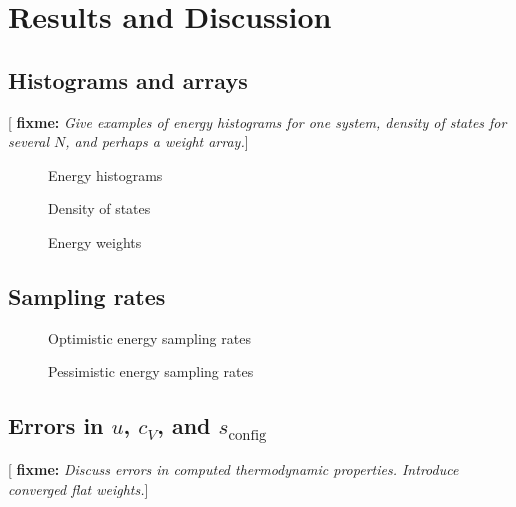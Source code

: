 \documentclass[11pt]{article}
\renewcommand{\t}{\text} %
\newcommand{\red}[1]{{\bf \color{red} #1}}
\newcommand{\fixme}[1]{[\red{fixme:} \emph{#1}]}
\begin{document}
\section{Results and Discussion}
\label{sec:results}

\subsection{Histograms and arrays}
\label{sec:histograms}

\fixme{Give examples of energy histograms for one system, density of
  states for several $N$, and perhaps a weight array.}

\begin{figure}[H]
  \centering
  \caption[Energy histograms]{Energy histograms}
  \label{fig:histograms}
\end{figure}

\begin{figure}[H]
  \centering
  \caption[Density of states]{Density of states}
  \label{fig:density_of_states}
\end{figure}

\begin{figure}[H]
  \centering
  \caption[Energy weights]{Energy weights}
  \label{fig:weights}
\end{figure}

\subsection{Sampling rates}
\label{sec:sampling_rates}

\begin{figure}[H]
  \centering
  \caption[Optimistic energy sampling rates]{Optimistic energy
    sampling rates}
  \label{fig:opt_sample_rate}
\end{figure}

\begin{figure}[H]
  \centering
  \caption[Pessimistic energy sampling rates]{Pessimistic energy
    sampling rates}
  \label{fig:pes_sample_rate}
\end{figure}

\subsection{Errors in $u$, $c_V$, and $s_{\t{config}}$}
\label{sec:errors}

\fixme{Discuss errors in computed thermodynamic properties. Introduce
  converged flat weights.}
\end{document}
